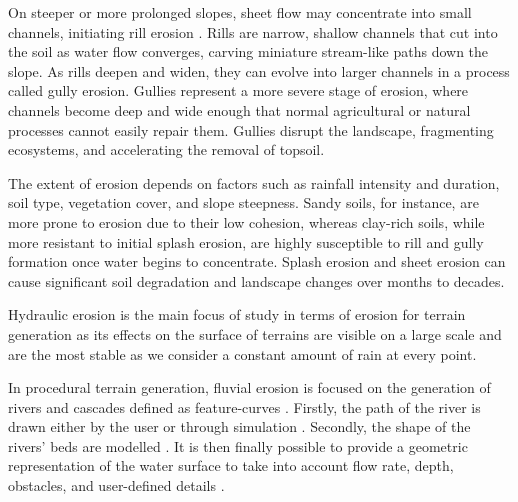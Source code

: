 
On steeper or more prolonged slopes, sheet flow may concentrate into small channels, initiating rill erosion \cite{Gatto2000}. Rills are narrow, shallow channels that cut into the soil as water flow converges, carving miniature stream-like paths down the slope. As rills deepen and widen, they can evolve into larger channels in a process called gully erosion. Gullies represent a more severe stage of erosion, where channels become deep and wide enough that normal agricultural or natural processes cannot easily repair them. Gullies disrupt the landscape, fragmenting ecosystems, and accelerating the removal of topsoil.

The extent of erosion depends on factors such as rainfall intensity and duration, soil type, vegetation cover, and slope steepness. Sandy soils, for instance, are more prone to erosion due to their low cohesion, whereas clay-rich soils, while more resistant to initial splash erosion, are highly susceptible to rill and gully formation once water begins to concentrate. Splash erosion and sheet erosion can cause significant soil degradation and landscape changes over months to decades.

\smallConclusion

Hydraulic erosion is the main focus of study in terms of erosion for terrain generation as its effects on the surface of terrains are visible on a large scale and are the most stable as we consider a constant amount of rain at every point.

In procedural terrain generation, fluvial erosion is focused on the generation of rivers and cascades defined as feature-curves \cite{Emilien2015}. Firstly, the path of the river is drawn either by the user \cite{Hnaidi2010} or through simulation \cite{ParisThesis}. Secondly, the shape of the rivers' beds are modelled \cite{Genevaux2013}. It is then finally possible to provide a geometric representation of the water surface to take into account flow rate, depth, obstacles, and user-defined details \cite{Peytavie2019}.

